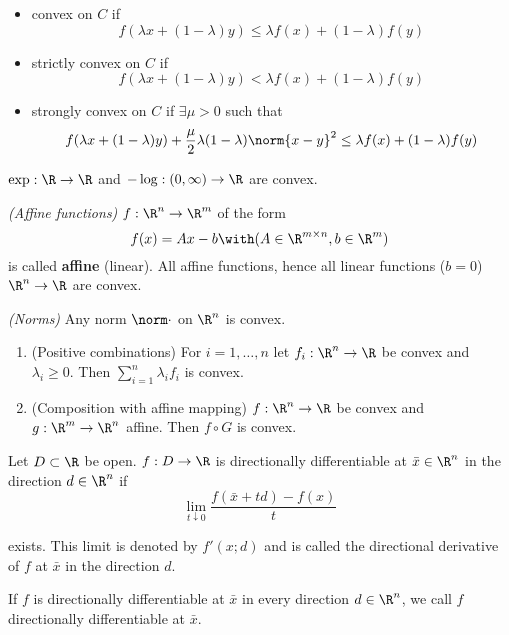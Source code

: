\begin{itemize}
	\item convex on $C$ if
	      $$f(\lambda x+(1-\lambda)y)\leq\lambda f(x)+(1-\lambda)f(y)$$
	\item strictly convex on $C$ if
	      $$f(\lambda x+(1-\lambda)y)<\lambda f(x)+(1-\lambda)f(y)$$
	\item strongly convex on $C$ if $\exists\mu>0$ such that
	      $$f(\lambda x+(1-\lambda)y)+\frac{\mu}{2}\lambda(1-\lambda)\norm{x-y}^2\leq\lambda f(x)+(1-\lambda)f(y)$$
\end{itemize}

\label{f96c8ae}

\begin{enumerata}
	\item $\exp:\R\to\R$ and $-\log:(0,\infty)\to\R$ are convex.
	\item \textit{(Affine functions)} $f:\R^n\to\R^m$ of the form
	$$
		f(x)=Ax-b\with(A\in\R^{m\times n},b\in\R^m)
	$$
	is called \textbf{affine} (linear). All affine functions, hence
	all linear functions ($b=0$) $\R^n\to\R$ are convex.
	\item \textit{(Norms)} Any norm $\norm\cdot$ on $\R^n$ is convex.
\end{enumerata}

\label{ddce2a7}

\begin{enumerate}
	\item (Positive combinations) For $i=1,\ldots,n$ let $f_i:\R^n\to\R$ be
	      convex and $\lambda_i\geq0$. Then $\sum_{i=1}^n\lambda_if_i$ is
	      convex.
	\item (Composition with affine mapping) $f:\R^n\to\R$ be convex
	      and $g:\R^m\to\R^n$ affine. Then $f\circ G$ is convex.
\end{enumerate}

\label{37eb747}

Let $D\subset \R$ be open. $f:D\to\R$ is directionally differentiable
at $\bar x\in\R^n$ in the direction $d\in\R^n$ if
$$
	\lim_{t\downarrow0}\frac{f(\bar x+td)-f(x)}t
$$

exists. This limit is denoted by $f'(x;d)$ and is called the
directional derivative of $f$ at $\bar x$ in the direction $d$.

If $f$ is directionally differentiable at $\bar x$ in every direction
$d\in\R^n$, we call $f$ directionally differentiable at $\bar x$.

